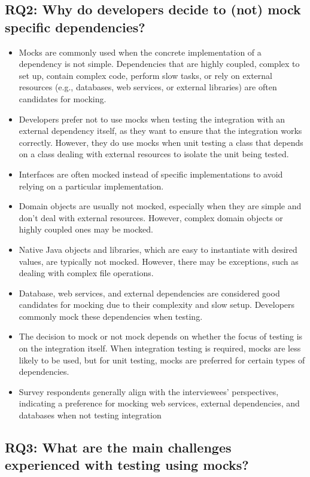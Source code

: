 \documentclass[11pt,a4paper]{article}
\begin{document}
\subsection{RQ2: Why do developers decide to (not) mock specific dependencies?}

\begin{itemize}
    \item Mocks are commonly used when the concrete implementation of a dependency is not simple. Dependencies that are highly coupled, complex to set up, contain complex code, perform slow tasks, or rely on external resources (e.g., databases, web services, or external libraries) are often candidates for mocking.
    \item Developers prefer not to use mocks when testing the integration with an external dependency itself, as they want to ensure that the integration works correctly. However, they do use mocks when unit testing a class that depends on a class dealing with external resources to isolate the unit being tested.
    \item Interfaces are often mocked instead of specific implementations to avoid relying on a particular implementation.
    \item Domain objects are usually not mocked, especially when they are simple and don't deal with external resources. However, complex domain objects or highly coupled ones may be mocked.
    \item Native Java objects and libraries, which are easy to instantiate with desired values, are typically not mocked. However, there may be exceptions, such as dealing with complex file operations.
    \item Database, web services, and external dependencies are considered good candidates for mocking due to their complexity and slow setup. Developers commonly mock these dependencies when testing.
    \item The decision to mock or not mock depends on whether the focus of testing is on the integration itself. When integration testing is required, mocks are less likely to be used, but for unit testing, mocks are preferred for certain types of dependencies.
    \item Survey respondents generally align with the interviewees' perspectives, indicating a preference for mocking web services, external dependencies, and databases when not testing integration
\end{itemize}

\subsection{RQ3: What are the main challenges experienced with testing using mocks?}
\end{document}
